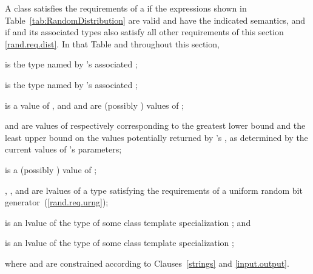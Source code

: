 \pnum
A class 
satisfies the requirements
of a 
if the expressions shown
in Table~\ref{tab:RandomDistribution}
are valid and have the indicated semantics,
and if  and its associated types
also satisfy all other requirements
of this section \ref{rand.req.dist}.
In that Table and throughout this section,
\begin{enumeratea}
  \item
     is the type named by
    's associated ;
  \item
     is the type named by
    's associated ;
  \item
     is a
    value of ,
    and
     and  are (possibly ) values of ;
  \item
     and 
    are values of 
    respectively corresponding to
    the greatest lower bound and the least upper bound
    on the values potentially returned by 's ,
    as determined by the current values of 's parameters;
  \item
     is a (possibly ) value of ;
  \item
    , , and  are lvalues of a type
    satisfying the requirements
    of a uniform random bit generator~(\ref{rand.req.urng});
  \item
     is an lvalue of the type of some class template specialization
     ;
  and
  \item
     is an lvalue of the type of some class template specialization
     ;
\end{enumeratea}
where  and  are constrained
according to Clauses~\ref{strings} and \ref{input.output}.

